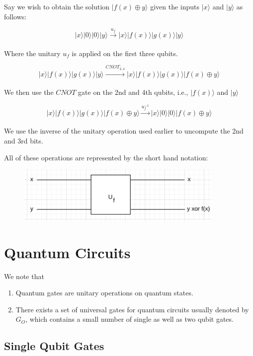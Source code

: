 \documentclass{article}
\begin{document}
Say we wish to obtain the solution $|f(x)\oplus y \rangle$ given the inputs $|x\rangle$ and $|y\rangle$ as follows:

$$|x\rangle |0\rangle |0\rangle |y\rangle \xrightarrow[]{u_f} |x\rangle |f(x)\rangle |g(x)\rangle |y\rangle$$

Where the unitary $u_f$ is applied on the first three qubits.

$$|x\rangle |f(x)\rangle |g(x)\rangle |y\rangle \xrightarrow[]{CNOT_{2,4}} |x\rangle |f(x)\rangle |g(x)\rangle |f(x) \oplus y\rangle$$

We then use the $CNOT$ gate on the 2nd and 4th qubits, i.e., $|f(x)\rangle$ and $|y\rangle$

$$|x\rangle |f(x)\rangle |g(x)\rangle |f(x) \oplus y\rangle \xrightarrow[]{u^{-1}_f} |x\rangle |0\rangle |0\rangle |f(x) \oplus y\rangle$$

We use the inverse of the unitary operation used earlier to uncompute the 2nd and 3rd bits.

All of these operations are represented by the short hand notation:

\begin{figure}[htp]
    \centering
    \includegraphics[width=10cm]{uncomputation.png}
\end{figure}

\section {Quantum Circuits}

We note that
\begin{enumerate}
    \item Quantum gates are unitary operations on quantum states.
    \item There exists a set of universal gates for quantum circuits usually denoted by $G_O$, which contains a small number of single as well as two qubit gates.
\end{enumerate}

\subsection{Single Qubit Gates}
\end{document}
